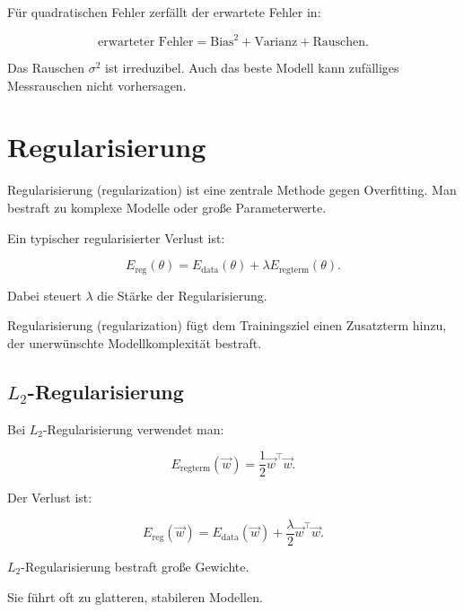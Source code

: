 \begin{definitionbox}
Für quadratischen Fehler zerfällt der erwartete Fehler in:

\[
    \text{erwarteter Fehler}
    =
    \text{Bias}^2
    +
    \text{Varianz}
    +
    \text{Rauschen}.
\]
\end{definitionbox}

\begin{notebox}
Das Rauschen \(\sigma^2\) ist irreduzibel.
Auch das beste Modell kann zufälliges Messrauschen nicht vorhersagen.
\end{notebox}

\section{Regularisierung}

Regularisierung (regularization) ist eine zentrale Methode gegen Overfitting.
Man bestraft zu komplexe Modelle oder große Parameterwerte.

Ein typischer regularisierter Verlust ist:

\[
    E_{\mathrm{reg}}(\theta)
    =
    E_{\mathrm{data}}(\theta)
    +
    \lambda E_{\mathrm{regterm}}(\theta).
\]

Dabei steuert \(\lambda\) die Stärke der Regularisierung.

\begin{definitionbox}
Regularisierung (regularization) fügt dem Trainingsziel einen Zusatzterm hinzu, der unerwünschte Modellkomplexität bestraft.
\end{definitionbox}

\subsection{\(L_2\)-Regularisierung}

Bei \(L_2\)-Regularisierung verwendet man:

\[
    E_{\mathrm{regterm}}(\vec{w})
    =
    \frac{1}{2}
    \vec{w}^{\top}\vec{w}.
\]

Der Verlust ist:

\[
    E_{\mathrm{reg}}(\vec{w})
    =
    E_{\mathrm{data}}(\vec{w})
    +
    \frac{\lambda}{2}
    \vec{w}^{\top}\vec{w}.
\]

\begin{conceptbox}
\(L_2\)-Regularisierung bestraft große Gewichte.

Sie führt oft zu glatteren, stabileren Modellen.
\end{conceptbox}

